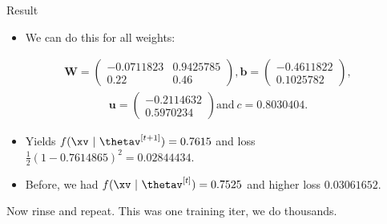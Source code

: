 \begin{vbframe}{Result}
  \begin{itemize}
    \item We can do this for all weights:
  \end{itemize}
  \begin{eqnarray*}
    \textbf{W} = \begin{pmatrix}
    \num[round-mode=places,round-precision=4]{-0.0711823} & \num[round-mode=places,round-precision=4]{0.9425785} \\
    0.22 & 0.46
    \end{pmatrix},
    \textbf{b} = \begin{pmatrix}
    \num[round-mode=places,round-precision=4]{-0.4611822} \\
    \num[round-mode=places,round-precision=4]{0.1025782}
    \end{pmatrix},
  \end{eqnarray*}
  \begin{eqnarray*}
    \textbf{u} = \begin{pmatrix}
    \num[round-mode=places,round-precision=4]{-0.2114632} \\
    \num[round-mode=places,round-precision=4]{0.5970234}
    \end{pmatrix}
    \text{and} \ c = \num[round-mode=places,round-precision=4]{0.8030404}\text{.}
  \end{eqnarray*}

  \begin{itemize}
    \item Yields $f(\xv ~|~\thetav^{[t+1]}) = \num[round-mode=places,round-precision=4]{0.7614865}$ and loss 
        $\frac{1}{2}(1 - \num[round-mode=places,round-precision=4]{0.7614865})^2 = \num[round-mode=places,round-precision=4]{0.02844434}.$
    \item Before, we had $f(\xv ~|~\thetav^{[t]}) = \num[round-mode=places,round-precision=4]{0.7525469}$ and higher loss $\num[round-mode=places,round-precision=4]{0.03061652}$.

  \end{itemize}
\lz
 Now rinse and repeat. This was one training iter, we do thousands.
\end{vbframe}

